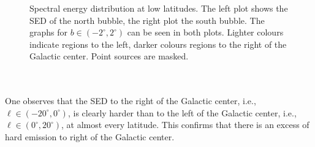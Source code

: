 \documentclass[a4paper]{article}
\begin{document}
\begin{figure}[h!!!]
\caption{Spectral energy distribution at low latitudes. The left plot shows the SED of the north bubble, the right plot the south bubble. The graphs for $b \in (-2^\circ,2^\circ)$ can be seen in both plots. Lighter colours indicate regions to the left, darker colours regions to the right of the Galactic center. Point sources are masked.}
\label{SED_at_low_lat}
\end{figure}\\
\\
One observes that the SED to the right of the Galactic center, i.e., $\ell \in (-20^\circ, 0^\circ)$, is clearly harder than to the left of the Galactic center, i.e., $\ell \in (0^\circ, 20^\circ)$, at almost every latitude. This confirms that there is an excess of hard emission to right of the Galactic center.
\end{document}
